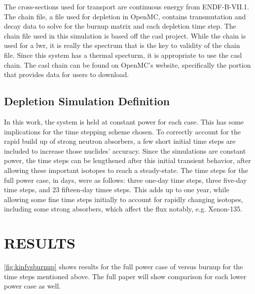 \documentclass[letterpaper]{physor2024}
\begin{document}
The cross-sections used for transport are continuous energy from ENDF-B-VII.1. The chain file, a file used for depletion in OpenMC, contains transmutation and decay data to solve for the burnup matrix and each depletion time step. The chain file used in this simulation is based off the \gls{casl} project. While the chain is used for a \gls{lwr}, it is really the spectrum that is the key to validity of the chain file. Since this system has a thermal specturm, it is appropriate to use the \gls{casl} chain. The \gls{casl} chain can be found on OpenMC's website, specifically the portion that provides data for users to download.

\subsection{Depletion Simulation Definition}\label{sec:depl_sim}

In this work, the system is held at constant power for each case. This has some implications for the time stepping scheme chosen. To correctly account for the rapid build up of strong neutron absorbers, a few short initial time steps are included to increase those nuclides' accuracy. Since the simulations are constant power, the time steps can be lengthened after this initial transient behavior, after allowing these important isotopes to reach a steady-state. The time steps for the full power case, in days, were as follows: three one-day time steps, three five-day time steps, and 23 fifteen-day timee steps. This adds up to one year, while allowing some fine time steps initially to account for rapidly changing isotopes, including some strong absorbers, which affect the flux notably, e.g. Xenon-135.
\newpage

\section{RESULTS}\label{sec:results}
\cref{fig:kinfvsburnup} shows results for the full power case of \kinf versus burnup for the time steps mentioned above. The full paper will show comparison for each lower power case as well.
\end{document}
